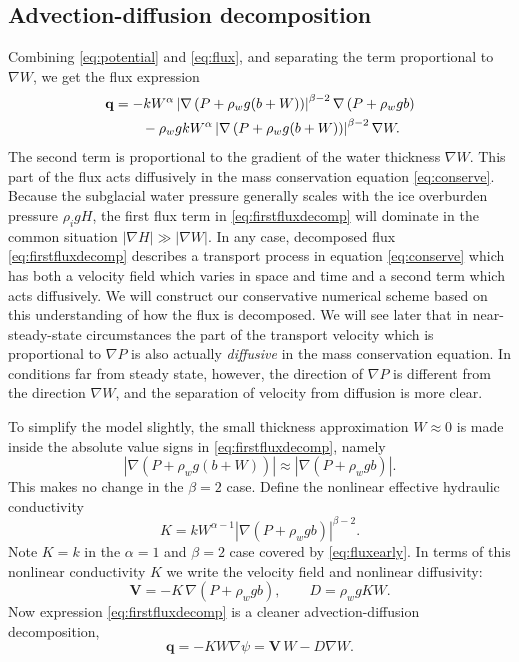 \documentclass[11pt,final]{amsart}
\newcommand\bV{\mathbf{V}}
\newcommand\bq{\mathbf{q}}
\newcommand{\grad}{\nabla}
\begin{document}
\subsection*{Advection-diffusion decomposition}  Combining \eqref{eq:potential} and \eqref{eq:flux}, and separating the term proportional to $\grad W$, we get the flux expression
\begin{align}
  \bq &= - k  W^\alpha \left|\grad \left(P + \rho_w g (b+W) \right)\right|^{\beta-2} \grad \left(P + \rho_w g b\right)  \label{eq:firstfluxdecomp} \\
      &\qquad - \rho_w g k W^\alpha \left|\grad \left(P + \rho_w g (b+W) \right)\right|^{\beta-2} \grad W. \notag
\end{align}
The second term is proportional to the gradient of the water thickness $\grad W$.  This part of the flux acts diffusively in the mass conservation equation \eqref{eq:conserve}.  Because the subglacial water pressure generally scales with the ice overburden pressure $\rho_i g H$, the first flux term in \eqref{eq:firstfluxdecomp} will dominate in the common situation $|\grad H| \gg |\grad W|$.  In any case, decomposed flux \eqref{eq:firstfluxdecomp} describes a transport process in equation \eqref{eq:conserve} which has both a velocity field which varies in space and time and a second term which acts diffusively.  We will construct our conservative numerical scheme based on this understanding of how the flux is decomposed.  We will see later that in near-steady-state circumstances the part of the transport velocity which is proportional to $\grad P$ is also actually \emph{diffusive} in the mass conservation equation.  In conditions far from steady state, however, the direction of $\grad P$ is different from the direction $\grad W$, and the separation of velocity from diffusion is more clear.

To simplify the model slightly, the small thickness approximation $W\approx 0$ is made inside the absolute value signs in \eqref{eq:firstfluxdecomp}, namely
\begin{equation}
\left|\grad \left(P + \rho_w g (b+W) \right)\right| \approx \left|\grad \left(P + \rho_w g b \right)\right|.  \label{eq:Wsmall}
\end{equation}
This makes no change in the $\beta=2$ case.  Define the nonlinear effective hydraulic conductivity
\begin{equation}
K = k W^{\alpha-1} \left|\grad(P+\rho_w g b)\right|^{\beta - 2}. \label{eq:Kdefine}
\end{equation}
Note $K = k$ in the $\alpha=1$ and $\beta=2$ case covered by \eqref{eq:fluxearly}.  In terms of this nonlinear conductivity $K$ we write the velocity field and nonlinear diffusivity:
\begin{equation} \label{eq:vexpression}
  \bV = - K\, \grad \left(P + \rho_w g b\right), \qquad D = \rho_w g K W.
\end{equation}
Now expression \eqref{eq:firstfluxdecomp} is a cleaner advection-diffusion decomposition,
\begin{equation} \label{eq:qexpression}
  \bq = - K W \grad \psi = \bV\, W - D \grad W.
\end{equation}
\end{document}
